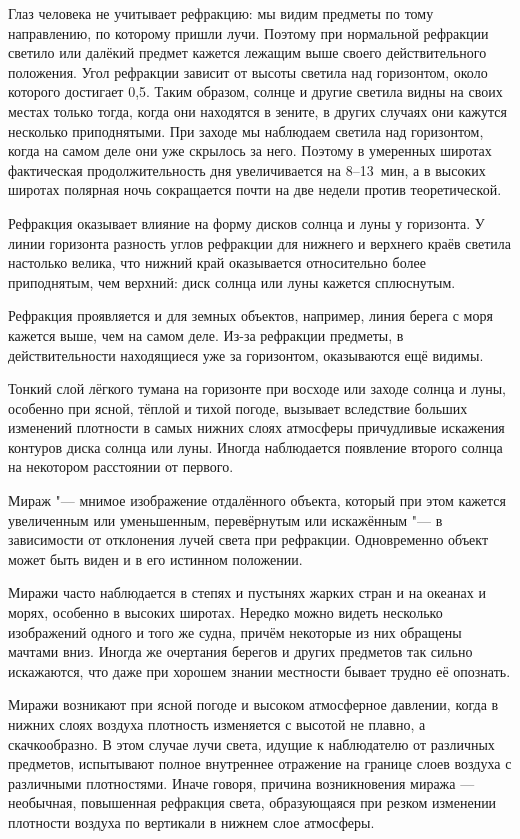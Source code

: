 Глаз человека не учитывает рефракцию: мы видим предметы по тому
направлению, по которому пришли лучи. Поэтому при нормальной рефракции
светило или далёкий предмет кажется лежащим выше своего
действительного положения. Угол рефракции зависит от высоты светила
над горизонтом, около которого достигает 0,5\gr. Таким образом, солнце и
другие светила видны на своих местах только тогда, когда они находятся
в зените, в других случаях они кажутся несколько приподнятыми. При
заходе мы наблюдаем светила над горизонтом, когда на самом деле они
уже скрылось за него. Поэтому в умеренных широтах фактическая
продолжительность дня увеличивается на 8--13~мин, а в высоких широтах
полярная ночь сокращается почти на две недели против теоретической.

Рефракция оказывает влияние на форму дисков солнца и луны у
горизонта. У линии горизонта разность углов рефракции для нижнего и
верхнего краёв светила настолько велика, что нижний край оказывается
относительно более приподнятым, чем верхний: диск солнца или луны
кажется сплюснутым.

Рефракция проявляется и для земных объектов, например, линия берега с
моря кажется выше, чем на самом деле. Из-за рефракции предметы, в
действительности находящиеся уже за горизонтом, оказываются ещё
видимы.

Тонкий слой лёгкого тумана на горизонте при восходе или заходе солнца
и луны, особенно при ясной, тёплой и тихой погоде, вызывает вследствие
больших изменений плотности в самых нижних слоях атмосферы причудливые
искажения контуров диска солнца или луны. Иногда наблюдается появление
второго солнца на некотором расстоянии от первого.

Мираж "--- мнимое изображение отдалённого объекта, который при этом
кажется увеличенным или уменьшенным, перевёрнутым или искажённым "--- в
зависимости от отклонения лучей света при рефракции. Одновременно
объект может быть виден и в его истинном положении.

Миражи часто наблюдается в степях и пустынях жарких стран и на океанах
и морях, особенно в высоких широтах. Нередко можно видеть несколько
изображений одного и того же судна, причём некоторые из них обращены
мачтами вниз. Иногда же очертания берегов и других предметов так
сильно искажаются, что даже при хорошем знании местности бывает трудно
её опознать.

Миражи возникают при ясной погоде и высоком атмосферное давлении,
когда в нижних слоях воздуха плотность изменяется с высотой не плавно,
а скачкообразно. В этом случае лучи света, идущие к наблюдателю от
различных предметов, испытывают полное внутреннее отражение на границе
слоев воздуха с различными плотностями. Иначе говоря, причина
возникновения миража — необычная, повышенная рефракция света,
образующаяся при резком изменении плотности воздуха по вертикали в
нижнем слое атмосферы.

